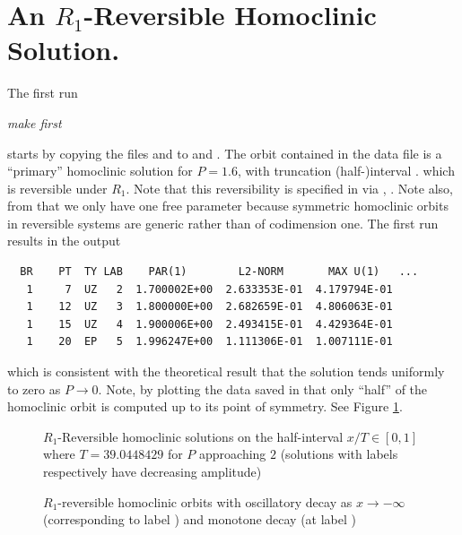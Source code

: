 \documentclass[12pt]{report}
\begin{document}
\section{An $R_1$-Reversible Homoclinic Solution.}

The first run
\begin{center}
\it make first
\end{center}
starts by 
copying the files  and  to 
 and . The orbit contained in
the data file is a ``primary'' homoclinic solution for $P=1.6$, with
truncation (half-)interval .
which is reversible under $R_1$. Note that this reversibility is
specified in  via , 
 . Note also, from
 that we only have one free parameter 
because symmetric homoclinic orbits in reversible systems are
generic rather than of codimension one.
The first run  results in the output
\begin{verbatim}
  BR    PT  TY LAB    PAR(1)        L2-NORM       MAX U(1)   ...   
   1     7  UZ   2  1.700002E+00  2.633353E-01  4.179794E-01
   1    12  UZ   3  1.800000E+00  2.682659E-01  4.806063E-01
   1    15  UZ   4  1.900006E+00  2.493415E-01  4.429364E-01
   1    20  EP   5  1.996247E+00  1.111306E-01  1.007111E-01
\end{verbatim}
which is consistent with the theoretical result that the solution
tends uniformly to zero as $P\to 0$. Note, by plotting the data
saved in  that only ``half'' of the 
homoclinic orbit is computed up to its point of symmetry. See Figure
\ref{Frev1}.

\begin{figure}[p]
\epsfysize 9.0cm
\centerline{}
\caption{$R_1$-Reversible homoclinic solutions on the half-interval
$x/T \in [0,1]$ where $T=39.0448429$ for $P$ approaching $2$ (solutions
with labels  respectively have decreasing amplitude)}
\label{Frev1}
\end{figure}
\begin{figure}[p]
\epsfysize 9.0cm
\centerline{}
\caption{$R_1$-reversible homoclinic orbits with oscillatory decay 
as $x \to -\infty$ (corresponding to label ) and monotone decay 
(at label )}
\label{Frev2}
\end{figure}
\end{document}
